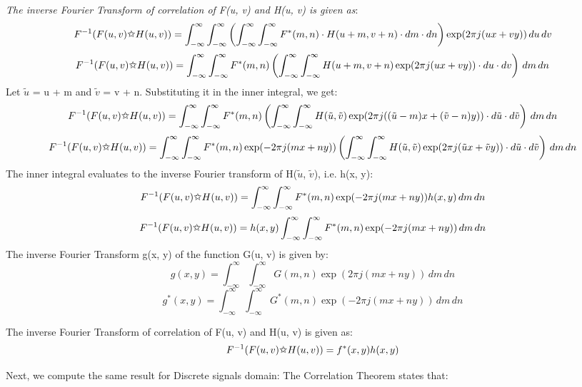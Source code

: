 \documentclass{article}
\begin{document}
\begin{enumerate}
\newpage

\textit{The inverse Fourier Transform of correlation of F(u, v) and H(u, v) is given as}:
\[
    F^{-1}(F(u, v) \text{\ding{73}} H(u, v)) = \int_{-\infty}^{\infty} \int_{-\infty}^{\infty} \left( \int_{-\infty}^{\infty} \int_{-\infty}^{\infty} F^*(m, n) \cdot H(u + m, v + n) \cdot dm \cdot dn \right) \exp(2 \pi j (ux + vy)) \, du \, dv
\]
\[
    F^{-1}(F(u, v) \text{\ding{73}} H(u, v)) = \int_{-\infty}^{\infty} \int_{-\infty}^{\infty} F^*(m, n) \left( \int_{-\infty}^{\infty} \int_{-\infty}^{\infty} H(u + m, v + n) \exp(2 \pi j (ux + vy)) \cdot du \cdot dv \right) \, dm \, dn
\]
Let $\tilde{u}$ = u + m and $\tilde{v}$ = v + n. Substituting it in the inner integral, we get:
\[
    F^{-1}(F(u, v) \text{\ding{73}} H(u, v)) = \int_{-\infty}^{\infty} \int_{-\infty}^{\infty} F^*(m, n) \left( \int_{-\infty}^{\infty} \int_{-\infty}^{\infty} H(\tilde{u}, \tilde{v}) \exp(2 \pi j ((\tilde{u} - m)x + (\tilde{v} - n)y)) \cdot d\tilde{u} \cdot d\tilde{v} \right) \, dm \, dn
\]
\[
    F^{-1}(F(u, v) \text{\ding{73}} H(u, v)) = \int_{-\infty}^{\infty} \int_{-\infty}^{\infty} F^*(m, n) \exp(- 2 \pi j (mx + ny)) \left( \int_{-\infty}^{\infty} \int_{-\infty}^{\infty} H(\tilde{u}, \tilde{v}) \exp(2 \pi j (\tilde{u}x + \tilde{v}y)) \cdot d\tilde{u} \cdot d\tilde{v} \right) \, dm \, dn
\]
The inner integral evaluates to the inverse Fourier transform of H($\tilde{u}$, $\tilde{v}$), i.e. h(x, y):
\[
    F^{-1}(F(u, v) \text{\ding{73}} H(u, v)) = \int_{-\infty}^{\infty} \int_{-\infty}^{\infty} F^*(m, n) \exp(- 2 \pi j (mx + ny)) h(x, y) \, dm \, dn
\]
\[
    F^{-1}(F(u, v) \text{\ding{73}} H(u, v)) = h(x, y) \int_{-\infty}^{\infty} \int_{-\infty}^{\infty} F^*(m, n) \exp(- 2 \pi j (mx + ny)) \, dm \, dn
\]
The inverse Fourier Transform g(x, y) of the function G(u, v) is given by:
\[
    g(x, y) = \int_{-\infty}^{\infty} \int_{-\infty}^{\infty} G(m, n) \exp(2 \pi j (mx + ny)) \, dm \, dn
\]
\[
    g^*(x, y) = \int_{-\infty}^{\infty} \int_{-\infty}^{\infty} G^*(m, n) \exp(-2 \pi j (mx + ny)) \, dm \, dn
\]

The inverse Fourier Transform of correlation of F(u, v) and H(u, v) is given as:
\[
    F^{-1}(F(u, v) \text{\ding{73}} H(u, v)) = f^*(x, y) h(x, y)
\]


Next, we compute the same result for Discrete signals domain:
The Correlation Theorem states that:


\end{enumerate}
\end{document}
